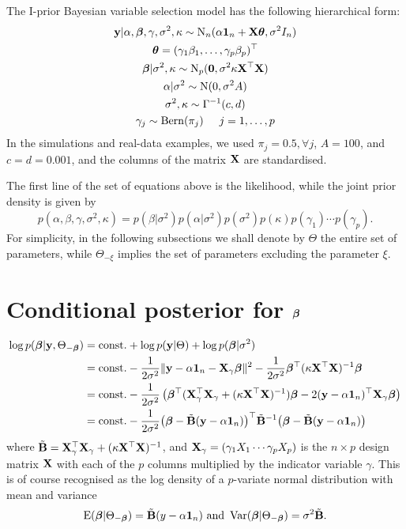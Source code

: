 The I-prior Bayesian variable selection model has the following hierarchical form:
\begin{align*}
  \begin{gathered}
    {\mathbf y}|\alpha,{\bm\beta},\gamma,\sigma^2,\kappa \sim \operatorname{N}_n(\alpha{\mathbf 1}_n + {\mathbf X}{\bm\theta}, \sigma^2 I_n) \\
    {\bm\theta} = (\gamma_1\beta_1,\dots,\gamma_p\beta_p)^\top \\
    {\bm\beta}|\sigma^2,\kappa \sim \operatorname{N}_p({\mathbf 0},\sigma^2\kappa \mathbf X^\top \mathbf X) \\
    \alpha|\sigma^2 \sim \operatorname{N}(0,\sigma^2 A) \\
    \sigma^2,\kappa \sim \Gamma^{-1}(c,d) \\
    \gamma_j \sim \operatorname{Bern}(\pi_j) \hspace{0.5cm} j=1,\dots,p
  \end{gathered}
\end{align*}
In the simulations and real-data examples, we used $\pi_j=0.5, \forall j$, $A=100$, and $c=d=0.001$, and the columns of the matrix ${\mathbf X}$ are standardised.

The first line of the set of equations above is the likelihood, while the joint prior density is given by
\[
  p(\alpha,\beta,\gamma,\sigma^2,\kappa) = p(\beta|\sigma^2)p(\alpha|\sigma^2)p(\sigma^2)p(\kappa)p(\gamma_1)\cdots p(\gamma_p).
\]    
For simplicity, in the following subsections we shall denote by $\Theta$ the entire set of parameters, while $\Theta_{-\xi}$ implies the set of parameters excluding the parameter $\xi$.

\section{Conditional posterior for \texorpdfstring{${\bm\beta}$}{$beta$}}

\begin{align*}
  \log p({\bm\beta}|{\mathbf y},\Theta_{-{\bm\beta}}) 
  &= \text{const.}\hspace{0.01em} + \log p({\mathbf y}|\Theta) + \log p({\bm\beta}|\sigma^2) \\
  &= \text{const.}\hspace{0.01em} - \frac{1}{2\sigma^2} \Vert {\mathbf y} - \alpha {\mathbf 1}_n - {\mathbf X}_\gamma{\bm\beta} \Vert^2  
  - \frac{1}{2\sigma^2}{\bm\beta}^\top (\kappa \mathbf X^\top \mathbf X)^{-1} {\bm\beta} \\
  &= \text{const.}\hspace{0.01em} - \frac{1}{2\sigma^2} \left( {\bm\beta}^\top ({\mathbf X}_\gamma^\top {\mathbf X}_\gamma + (\kappa \mathbf X^\top \mathbf X)^{-1}) {\bm\beta} - 2({\mathbf y} - \alpha {\mathbf 1}_n)^\top {\mathbf X}_\gamma{\bm\beta} \right) \\
  &= \text{const.}\hspace{0.01em} - \frac{1}{2\sigma^2} \big({\bm\beta} - \tilde {{\mathbf B}}({\mathbf y} - \alpha {\mathbf 1}_n)\big)^\top \tilde {{\mathbf B}}^{-1} \big({\bm\beta} - \tilde {{\mathbf B}}({\mathbf y} - \alpha {\mathbf 1}_n)\big) 
\end{align*}
where $\tilde {{\mathbf B}} = {\mathbf X}_\gamma^\top {\mathbf X}_\gamma + (\kappa \mathbf X^\top \mathbf X)^{-1}$, and ${\mathbf X}_\gamma = (\gamma_1X_1 \cdots \gamma_pX_p)$ is the $n \times p$ design matrix ${\mathbf X}$ with each of the $p$ columns multiplied by the indicator variable $\gamma$.
This is of course recognised as the log density of a $p$-variate normal distribution with mean and variance
\[
  \operatorname{E}({\bm\beta}|\Theta_{-{\bm\beta}}) = \tilde {{\mathbf B}}(y - \alpha {\mathbf 1}_n) \text{ and } \operatorname{Var}({\bm\beta}|\Theta_{-{\bm\beta}}) = \sigma^2\tilde {{\mathbf B}}.
 \]

